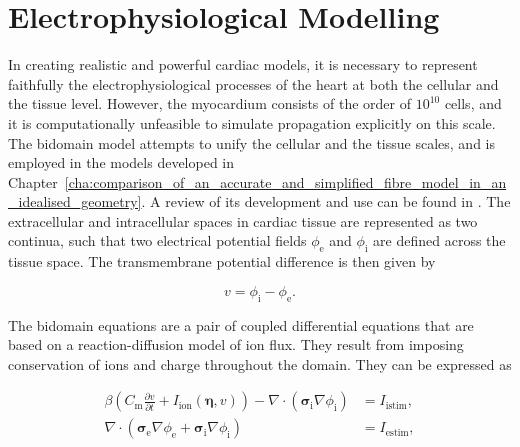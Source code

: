 \section{Electrophysiological Modelling}
\label{sec:electrophysiological_modelling}
  In creating realistic and powerful cardiac models, it is necessary to represent faithfully the electrophysiological processes of the heart at both the cellular and the tissue level. However, the myocardium consists of the order of $10^{10}$ cells, and it is computationally unfeasible to simulate propagation explicitly on this scale. The bidomain model attempts to unify the cellular and the tissue scales, and is employed in the models developed in Chapter~\ref{cha:comparison_of_an_accurate_and_simplified_fibre_model_in_an_idealised_geometry}. A review of its development and use can be found in \cite{Henriquez1993}. The extracellular and intracellular spaces in cardiac tissue are represented as two continua, such that two electrical potential fields $\phi_\text{e}$ and $\phi_\text{i}$ are defined across the tissue space. The transmembrane potential difference is then given by
  
  \begin{equation}
    v = \phi_\text{i} - \phi_\text{e}.
  \end{equation}
  
  The bidomain equations are a pair of coupled differential equations that are based on a reaction-diffusion model of ion flux. They result from imposing conservation of ions and charge throughout the domain. They can be expressed as
  
  \begin{align}
    \beta \left( C_\text{m}\frac{\partial v}{\partial t} + I_\text{ion}\left( \boldsymbol\eta, v \right) \right) - \nabla \cdot \left( \boldsymbol\sigma_\text{i} \nabla \phi_\text{i} \right) &= I_\text{istim}, \\
      \nabla \cdot \left( \boldsymbol\sigma_\text{e} \nabla \phi_\text{e} +  \boldsymbol\sigma_\text{i} \nabla \phi_\text{i} \right) &= I_\text{estim},
  \end{align}
  
